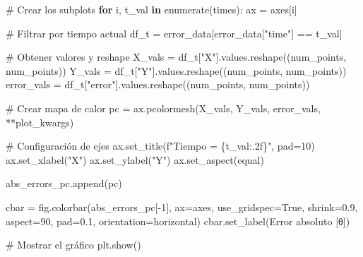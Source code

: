 \documentclass[
  spanish,
  us-letterpaper,
]{scrreprt}
\newenvironment{Shaded}{\begin{snugshade}}{\end{snugshade}}
\newcommand{\BuiltInTok}[1]{\textcolor[rgb]{0.00,0.23,0.31}{#1}}
\newcommand{\CommentTok}[1]{\textcolor[rgb]{0.37,0.37,0.37}{#1}}
\newcommand{\ControlFlowTok}[1]{\textcolor[rgb]{0.00,0.23,0.31}{\textbf{#1}}}
\newcommand{\DecValTok}[1]{\textcolor[rgb]{0.68,0.00,0.00}{#1}}
\newcommand{\FloatTok}[1]{\textcolor[rgb]{0.68,0.00,0.00}{#1}}
\newcommand{\KeywordTok}[1]{\textcolor[rgb]{0.00,0.23,0.31}{\textbf{#1}}}
\newcommand{\NormalTok}[1]{\textcolor[rgb]{0.00,0.23,0.31}{#1}}
\newcommand{\OperatorTok}[1]{\textcolor[rgb]{0.37,0.37,0.37}{#1}}
\newcommand{\SpecialCharTok}[1]{\textcolor[rgb]{0.37,0.37,0.37}{#1}}
\newcommand{\SpecialStringTok}[1]{\textcolor[rgb]{0.13,0.47,0.30}{#1}}
\newcommand{\StringTok}[1]{\textcolor[rgb]{0.13,0.47,0.30}{#1}}
\newcommand{\VariableTok}[1]{\textcolor[rgb]{0.07,0.07,0.07}{#1}}
\theoremstyle{definition}
\theoremstyle{plain}
\theoremstyle{remark}
\begin{document}
\begin{Shaded}
\begin{Highlighting}[]
\CommentTok{\# Crear los subplots}
\ControlFlowTok{for}\NormalTok{ i, t\_val }\KeywordTok{in} \BuiltInTok{enumerate}\NormalTok{(times):}
\NormalTok{    ax }\OperatorTok{=}\NormalTok{ axes[i]}
    
    \CommentTok{\# Filtrar por tiempo actual}
\NormalTok{    df\_t }\OperatorTok{=}\NormalTok{ error\_data[error\_data[}\StringTok{"time"}\NormalTok{] }\OperatorTok{==}\NormalTok{ t\_val]}
    
    \CommentTok{\# Obtener valores y reshape}
\NormalTok{    X\_vals }\OperatorTok{=}\NormalTok{ df\_t[}\StringTok{"X"}\NormalTok{].values.reshape((num\_points, num\_points))}
\NormalTok{    Y\_vals }\OperatorTok{=}\NormalTok{ df\_t[}\StringTok{"Y"}\NormalTok{].values.reshape((num\_points, num\_points))}
\NormalTok{    error\_vals }\OperatorTok{=}\NormalTok{ df\_t[}\StringTok{"error"}\NormalTok{].values.reshape((num\_points, num\_points))}
    
    \CommentTok{\# Crear mapa de calor}
\NormalTok{    pc }\OperatorTok{=}\NormalTok{ ax.pcolormesh(X\_vals, Y\_vals, error\_vals, }\OperatorTok{**}\NormalTok{plot\_kwargs)}
    
    \CommentTok{\# Configuración de ejes}
\NormalTok{    ax.set\_title(}\SpecialStringTok{f"Tiempo = }\SpecialCharTok{\{}\NormalTok{t\_val}\SpecialCharTok{:.2f\}}\SpecialStringTok{"}\NormalTok{, pad}\OperatorTok{=}\DecValTok{10}\NormalTok{)}
\NormalTok{    ax.set\_xlabel(}\StringTok{"X"}\NormalTok{)}
\NormalTok{    ax.set\_ylabel(}\StringTok{"Y"}\NormalTok{)}
\NormalTok{    ax.set\_aspect(}\StringTok{\textquotesingle{}equal\textquotesingle{}}\NormalTok{)}

\NormalTok{    abs\_errors\_pc.append(pc)}

\NormalTok{cbar }\OperatorTok{=}\NormalTok{ fig.colorbar(abs\_errors\_pc[}\OperatorTok{{-}}\DecValTok{1}\NormalTok{], ax}\OperatorTok{=}\NormalTok{axes,}
\NormalTok{                    use\_gridspec}\OperatorTok{=}\VariableTok{True}\NormalTok{, shrink}\OperatorTok{=}\FloatTok{0.9}\NormalTok{,}
\NormalTok{                    aspect}\OperatorTok{=}\DecValTok{90}\NormalTok{, pad}\OperatorTok{=}\FloatTok{0.1}\NormalTok{, orientation}\OperatorTok{=}\StringTok{\textquotesingle{}horizontal\textquotesingle{}}\NormalTok{)}
\NormalTok{cbar.set\_label(}\StringTok{\textquotesingle{}Error absoluto [θ]\textquotesingle{}}\NormalTok{)}

\CommentTok{\# Mostrar el gráfico}
\NormalTok{plt.show()}
\end{Highlighting}
\end{Shaded}
\end{document}

